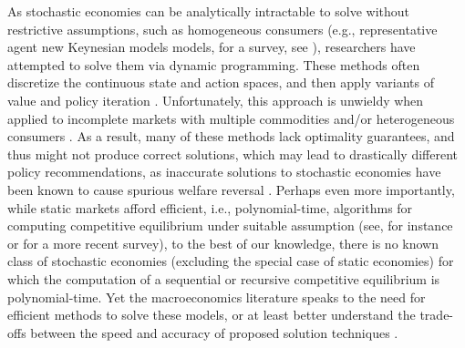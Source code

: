 As stochastic economies can be analytically intractable to solve without restrictive assumptions, such as homogeneous consumers (e.g., representative agent new Keynesian models  models, for a survey, see \citet{sargent2000recursive}), researchers have attempted to solve them via dynamic programming.
These methods often discretize the continuous state and action spaces, and then apply variants of value and policy iteration \cite{stokey1989recursive, sargent2000recursive, auclert2021using}. 
Unfortunately, this approach is unwieldy when applied to incomplete markets with multiple commodities and/or heterogeneous consumers \cite{fernandez1016solve}.
As a result, many of these methods lack optimality guarantees, and thus might not produce correct solutions, which may lead to drastically different policy recommendations, as inaccurate solutions to stochastic economies have been known to cause spurious welfare reversal \cite{kim2003spurious}.
Perhaps even more importantly, while static markets afford efficient, i.e., polynomial-time, algorithms for computing competitive equilibrium under suitable assumption (see, for instance \citet{jain2005market} or \citet{goktas2023tatonn} for a more recent survey), to the best of our knowledge, there is no known class of stochastic economies (excluding the special case of static economies) for which the computation of a sequential or recursive competitive equilibrium is polynomial-time. 
Yet the macroeconomics literature speaks to the need for efficient methods to solve these models, or at least better understand the trade-offs between the speed and accuracy of proposed solution techniques \cite{fernandez1016solve}.

